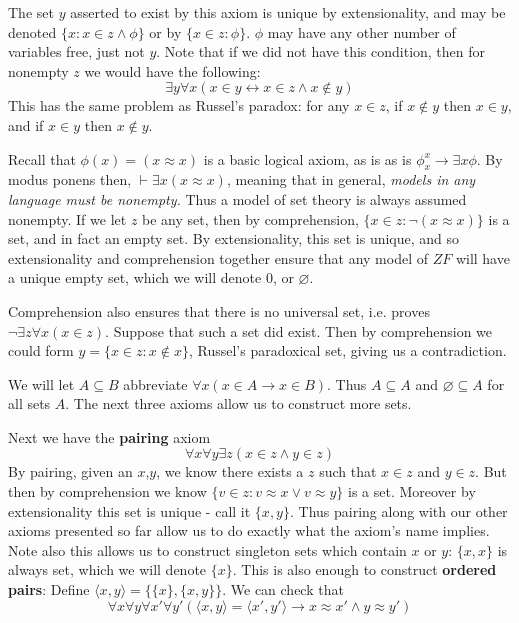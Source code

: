 \documentclass{article}
\theoremstyle{definition}
\theoremstyle{plain}
\theoremstyle{theorem}
\begin{document}
The set $y$ asserted to exist by this axiom is unique by extensionality, and may be denoted $\{x: x \in z \wedge \phi\}$ or by $\{x \in z: \phi\}$. $\phi$ may have any other number of variables free, just not $y$. Note that if we did not have this condition, then for nonempty $z$ we would have the following: 
\[ \exists y \forall x (x \in y \leftrightarrow x \in z \wedge x \notin y) \]
This has the same problem as Russel's paradox: for any $x \in z$, if $x \notin y$ then $x \in y$, and if $x \in y$ then $x \notin y$. 
\par Recall that $\phi(x) = (x \approx x)$ is a basic logical axiom, as is as is $\phi_x^x \rightarrow \exists x \phi$. By modus ponens then, $\vdash \exists x (x \approx x)$, meaning that in general, \textit{models in any language must be nonempty.} Thus a model of set theory is always assumed nonempty. If we let $z$ be any set, then by comprehension, $\{x \in z: \neg(x \approx x)\}$ is a set, and in fact an empty set. By extensionality, this set is unique, and so extensionality and comprehension together ensure that any model of $ZF$ will have a unique empty set, which we will denote $0$, or $\varnothing$. 
\par Comprehension also ensures that there is no universal set, i.e. proves $\neg \exists z \forall x (x \in z)$. Suppose that such a set did exist. Then by comprehension we could form $y = \{x \in z: x \notin x\}$, Russel's paradoxical set, giving us a contradiction. 
\par We will let $A \subseteq B$ abbreviate $\forall x (x \in A \rightarrow x \in B)$. Thus $A \subseteq A$ and $\varnothing  \subseteq A$ for all sets $A$. The next three axioms allow us to construct more sets.
\par Next we have the \textbf{pairing} axiom \[\forall x \forall y \exists z (x \in z \wedge y \in z)\]
By pairing, given an $x$,$y$, we know there exists a $z$ such that $x \in z$ and $y \in z$. But then by comprehension we know $\{v \in z: v \approx x \vee v \approx y\}$ is a set. Moreover by extensionality this set is unique - call it $\{x,y\}$. Thus pairing along with our other axioms presented so far allow us to do exactly what the axiom's name implies. Note also this allows us to construct singleton sets which contain $x$ or $y$: $\{x,x\}$ is always set, which we will denote $\{x\}$. This is also enough to construct \textbf{ordered pairs}: Define $\langle x,y \rangle = \{\{x\},\{x,y\}\}$. We can check that
\[ \forall x \forall y \forall x' \forall y' (\langle x,y \rangle = \langle x',y' \rangle \rightarrow x \approx x' \wedge y \approx y') \]
\end{document}
